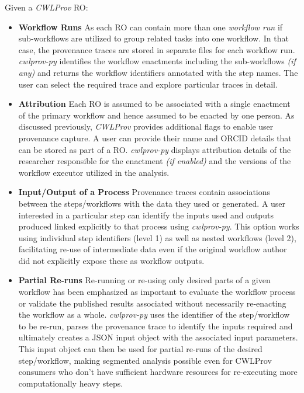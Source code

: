 \documentclass[a4paper,num-refs]{oup-contemporary}
\begin{document}
Given a \textit{CWLProv} RO:
\begin{itemize}
\item \textbf{Workflow Runs}\newline 
    As each RO can contain more than one \textit{workflow run} if sub-workflows are utilized to group related tasks into one workflow. In that case, the provenance traces are stored in separate files for each workflow run. \textit{cwlprov-py} identifies the workflow enactments including the sub-workflows \textit{(if any)} and returns the workflow identifiers annotated with the step names. The user can select the required trace and explore particular traces in detail.
\item \textbf{Attribution} \newline 
    Each RO is assumed to be associated with a single enactment of the primary workflow and hence assumed to be enacted by one person. As discussed previously, \textit{CWLProv} provides additional flags to enable user provenance capture. A user can provide their name and ORCID details that can be stored as part of a RO. \textit{cwlprov-py} displays attribution details of the researcher responsible for the enactment \textit{(if enabled)} and the versions of the workflow executor utilized in the analysis.
\item \textbf{Input/Output of a Process} \newline
    Provenance traces contain associations between the steps/workflows with the data they used or generated. A user interested in a particular step can identify the inputs used and outputs produced linked explicitly to that process using \textit{cwlprov-py}. This option works using individual step identifiers (level 1) as well as nested workflows (level 2), facilitating re-use of intermediate data even if the original workflow author did not explicitly expose these as workflow outputs.
\item \textbf{Partial Re-runs} \newline 
    Re-running or re-using only desired parts of a given workflow has been emphasized \citep{cohen2017scientific} as important to evaluate the workflow process or validate the published results associated without necessarily re-enacting the workflow as a whole. \textit{cwlprov-py} uses the identifier of the step/workflow to be re-run, parses the provenance trace to identify the inputs required and ultimately creates a JSON input object with the associated input parameters. This input object can then be used for partial re-runs of the desired step/workflow, making segmented analysis possible even for CWLProv consumers who don't have sufficient hardware resources for re-executing more computationally heavy steps. 
\end{itemize}
\end{document}
